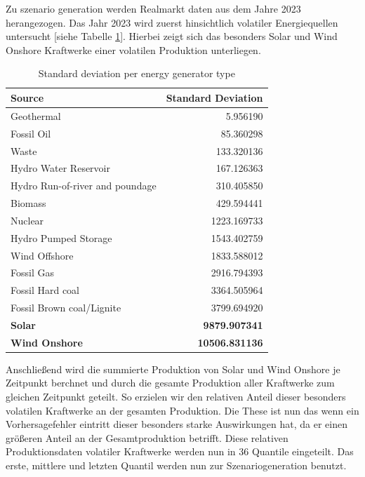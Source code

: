 Zu szenario generation werden Realmarkt daten aus dem Jahre 2023 herangezogen.
Das Jahr 2023 wird zuerst hinsichtlich volatiler Energiequellen untersucht [siehe Tabelle \ref{tab:energy_sources_std}].
Hierbei zeigt sich das besonders Solar und Wind Onshore Kraftwerke einer volatilen Produktion unterliegen.

\begin{table}[ht]
	\centering
	\begin{tabular}{|l|r|}
		\hline
		\textbf{Source}                 & \textbf{Standard Deviation} \\
		\hline
		Geothermal                      & 5.956190                    \\
		Fossil Oil                      & 85.360298                   \\
		Waste                           & 133.320136                  \\
		Hydro Water Reservoir           & 167.126363                  \\
		Hydro Run-of-river and poundage & 310.405850                  \\
		Biomass                         & 429.594441                  \\
		Nuclear                         & 1223.169733                 \\
		Hydro Pumped Storage            & 1543.402759                 \\
		Wind Offshore                   & 1833.588012                 \\
		Fossil Gas                      & 2916.794393                 \\
		Fossil Hard coal                & 3364.505964                 \\
		Fossil Brown coal/Lignite       & 3799.694920                 \\
		\textbf{Solar}                  & \textbf{9879.907341}        \\
		\textbf{Wind Onshore}           & \textbf{10506.831136}       \\
		\hline
	\end{tabular}
	\caption{Standard deviation per energy generator type}
	\label{tab:energy_sources_std}
\end{table}

Anschließend wird die summierte Produktion von Solar und Wind Onshore je Zeitpunkt berchnet und
durch die gesamte Produktion aller Kraftwerke zum gleichen Zeitpunkt geteilt. So erzielen wir den relativen
Anteil dieser besonders volatilen Kraftwerke an der gesamten Produktion. Die These ist nun das wenn ein Vorhersagefehler eintritt
dieser besonders starke Auswirkungen hat, da er einen größeren Anteil an der Gesamtproduktion betrifft.
Diese relativen Produktionsdaten volatiler Kraftwerke werden nun in 36 Quantile eingeteilt. Das erste, mittlere und letzten
Quantil werden nun zur Szenariogeneration benutzt.

